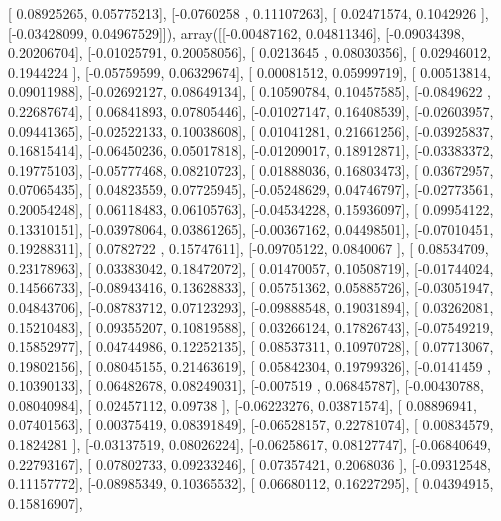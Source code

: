 \documentclass{article}
\begin{document}
       [ 0.08925265,  0.05775213],
       [-0.0760258 ,  0.11107263],
       [ 0.02471574,  0.1042926 ],
       [-0.03428099,  0.04967529]]), array([[-0.00487162,  0.04811346],
       [-0.09034398,  0.20206704],
       [-0.01025791,  0.20058056],
       [ 0.0213645 ,  0.08030356],
       [ 0.02946012,  0.1944224 ],
       [-0.05759599,  0.06329674],
       [ 0.00081512,  0.05999719],
       [ 0.00513814,  0.09011988],
       [-0.02692127,  0.08649134],
       [ 0.10590784,  0.10457585],
       [-0.0849622 ,  0.22687674],
       [ 0.06841893,  0.07805446],
       [-0.01027147,  0.16408539],
       [-0.02603957,  0.09441365],
       [-0.02522133,  0.10038608],
       [ 0.01041281,  0.21661256],
       [-0.03925837,  0.16815414],
       [-0.06450236,  0.05017818],
       [-0.01209017,  0.18912871],
       [-0.03383372,  0.19775103],
       [-0.05777468,  0.08210723],
       [ 0.01888036,  0.16803473],
       [ 0.03672957,  0.07065435],
       [ 0.04823559,  0.07725945],
       [-0.05248629,  0.04746797],
       [-0.02773561,  0.20054248],
       [ 0.06118483,  0.06105763],
       [-0.04534228,  0.15936097],
       [ 0.09954122,  0.13310151],
       [-0.03978064,  0.03861265],
       [-0.00367162,  0.04498501],
       [-0.07010451,  0.19288311],
       [ 0.0782722 ,  0.15747611],
       [-0.09705122,  0.0840067 ],
       [ 0.08534709,  0.23178963],
       [ 0.03383042,  0.18472072],
       [ 0.01470057,  0.10508719],
       [-0.01744024,  0.14566733],
       [-0.08943416,  0.13628833],
       [ 0.05751362,  0.05885726],
       [-0.03051947,  0.04843706],
       [-0.08783712,  0.07123293],
       [-0.09888548,  0.19031894],
       [ 0.03262081,  0.15210483],
       [ 0.09355207,  0.10819588],
       [ 0.03266124,  0.17826743],
       [-0.07549219,  0.15852977],
       [ 0.04744986,  0.12252135],
       [ 0.08537311,  0.10970728],
       [ 0.07713067,  0.19802156],
       [ 0.08045155,  0.21463619],
       [ 0.05842304,  0.19799326],
       [-0.0141459 ,  0.10390133],
       [ 0.06482678,  0.08249031],
       [-0.007519  ,  0.06845787],
       [-0.00430788,  0.08040984],
       [ 0.02457112,  0.09738   ],
       [-0.06223276,  0.03871574],
       [ 0.08896941,  0.07401563],
       [ 0.00375419,  0.08391849],
       [-0.06528157,  0.22781074],
       [ 0.00834579,  0.1824281 ],
       [-0.03137519,  0.08026224],
       [-0.06258617,  0.08127747],
       [-0.06840649,  0.22793167],
       [ 0.07802733,  0.09233246],
       [ 0.07357421,  0.2068036 ],
       [-0.09312548,  0.11157772],
       [-0.08985349,  0.10365532],
       [ 0.06680112,  0.16227295],
       [ 0.04394915,  0.15816907],
\end{document}
